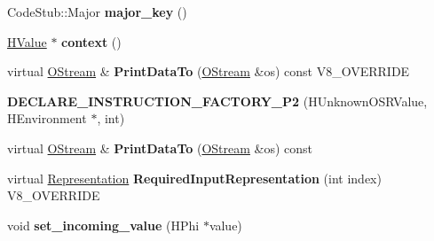 \begin{DoxyCompactItemize}
\item 
\hypertarget{classv8_1_1internal_1_1_v8___f_i_n_a_l_a2b351e963856982ab40bf4856ac8a155}{}Code\+Stub\+::\+Major {\bfseries major\+\_\+key} ()\label{classv8_1_1internal_1_1_v8___f_i_n_a_l_a2b351e963856982ab40bf4856ac8a155}

\item 
\hypertarget{classv8_1_1internal_1_1_v8___f_i_n_a_l_a911a04b75b22f133c5eb5eafcc2d5f87}{}\hyperlink{classv8_1_1internal_1_1_h_value}{H\+Value} $\ast$ {\bfseries context} ()\label{classv8_1_1internal_1_1_v8___f_i_n_a_l_a911a04b75b22f133c5eb5eafcc2d5f87}

\item 
\hypertarget{classv8_1_1internal_1_1_v8___f_i_n_a_l_ac450dad970b14246be761ccf5004924b}{}virtual \hyperlink{classv8_1_1internal_1_1_o_stream}{O\+Stream} \& {\bfseries Print\+Data\+To} (\hyperlink{classv8_1_1internal_1_1_o_stream}{O\+Stream} \&os) const V8\+\_\+\+O\+V\+E\+R\+R\+I\+D\+E\label{classv8_1_1internal_1_1_v8___f_i_n_a_l_ac450dad970b14246be761ccf5004924b}

\item 
\hypertarget{classv8_1_1internal_1_1_v8___f_i_n_a_l_a9dc334535a4af78ee88b99ed58f87d58}{}{\bfseries D\+E\+C\+L\+A\+R\+E\+\_\+\+I\+N\+S\+T\+R\+U\+C\+T\+I\+O\+N\+\_\+\+F\+A\+C\+T\+O\+R\+Y\+\_\+\+P2} (H\+Unknown\+O\+S\+R\+Value, H\+Environment $\ast$, int)\label{classv8_1_1internal_1_1_v8___f_i_n_a_l_a9dc334535a4af78ee88b99ed58f87d58}

\item 
\hypertarget{classv8_1_1internal_1_1_v8___f_i_n_a_l_a99730b75ac0205e5a0b9d85480863c6c}{}virtual \hyperlink{classv8_1_1internal_1_1_o_stream}{O\+Stream} \& {\bfseries Print\+Data\+To} (\hyperlink{classv8_1_1internal_1_1_o_stream}{O\+Stream} \&os) const \label{classv8_1_1internal_1_1_v8___f_i_n_a_l_a99730b75ac0205e5a0b9d85480863c6c}

\item 
\hypertarget{classv8_1_1internal_1_1_v8___f_i_n_a_l_a6c6d1f37f40b113d8f4062f1ffff7215}{}virtual \hyperlink{classv8_1_1internal_1_1_representation}{Representation} {\bfseries Required\+Input\+Representation} (int index) V8\+\_\+\+O\+V\+E\+R\+R\+I\+D\+E\label{classv8_1_1internal_1_1_v8___f_i_n_a_l_a6c6d1f37f40b113d8f4062f1ffff7215}

\item 
\hypertarget{classv8_1_1internal_1_1_v8___f_i_n_a_l_aa109f259e27b3f381f8b9c8fe52029c4}{}void {\bfseries set\+\_\+incoming\+\_\+value} (H\+Phi $\ast$value)\label{classv8_1_1internal_1_1_v8___f_i_n_a_l_aa109f259e27b3f381f8b9c8fe52029c4}


\end{DoxyCompactItemize}
